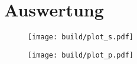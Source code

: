 \section{Auswertung}
\label{sec:auswertung}

\begin{figure}
	\texttt{[image: build/plot\_s.pdf]}
	\caption{}
	\label{fig:plot_s}
\end{figure}

\begin{figure}
	\texttt{[image: build/plot\_p.pdf]}
	\caption{}
	\label{fig:plot_p}
\end{figure}
